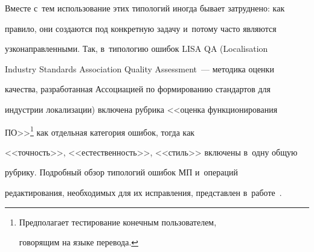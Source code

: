   

  Вместе с~тем использование этих типологий иногда бывает затруднено: как 

правило, они создаются под конкретную задачу и~потому часто являются 

узконаправленными. Так, в~типологию ошибок LISA QA (Localisation 

Industry Standards Association Quality Assessment~--- методика оценки 

качества, разработанная Ассоциацией по формированию стандартов для 

индустрии локализации) включена рубрика <<оценка функционирования 

ПО>>\footnote[4]{Предполагает тестирование конечным пользователем, 

говорящим на языке перевода.} как отдельная категория ошибок, тогда как 

<<точность>>, <<естественность>>, <<стиль>> включены в~одну общую 

рубрику. Подробный обзор типологий ошибок МП и~операций 

редактирования, необходимых для их исправления, представлен в~работе~\cite{17-r}.



